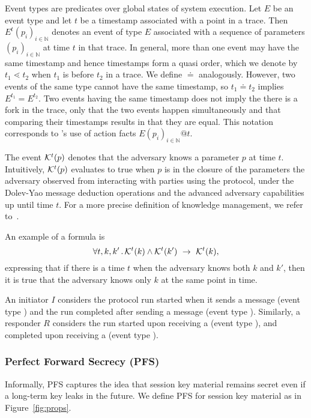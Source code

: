 Event types are predicates over global states of system execution.
%
Let $E$ be an event type and let $t$ be a timestamp associated with a point in a
trace.
%
Then $E^{t}(p_i)_{i\in\mathbb{N}}$ denotes an event of type $E$ associated with
a sequence of parameters $(p_i)_{i\in\mathbb{N}}$ at time $t$ in that trace.
%
In general, more than one event may have the same timestamp and hence
timestamps form a quasi order, which we denote by $t_1 \lessdot t_2$ when $t_1$
is before $t_2$ in a trace.
%
We define $\doteq$ analogously.
%
However, two events of the same type cannot have the same timestamp, so
$t_1 \doteq t_2$ implies $E^{t_1} = E^{t_2}$.
%
Two events having the same timestamp does not imply the there is a fork in the
trace, only that the two events happen simultaneously and that comparing their
timestamps results in that they are equal.
%
This notation corresponds to \mTamarin{}'s use of action facts
$E(p_i)_{i\in\mathbb{N}}@t$.
%

%
%
The event $\mathcal{K}^t(p)$ denotes that the adversary knows a parameter $p$ at
time $t$.
%
Intuitively, $\mathcal{K}^t(p)$ evaluates to true when $p$ is in
the closure of the
parameters the adversary observed from interacting with parties using the
protocol, under the Dolev-Yao message deduction operations and
the advanced adversary capabilities up until time $t$.
%
For a more precise definition of knowledge management, we refer to~\cite{DBLP:conf/cav/MeierSCB13}.
%

An example of a formula is
\[
    \forall t, k, k'\mLogicDot \mK^{t}(k) \land \mK^{t}(k')\ \rightarrow\ 
\mK^{t}(k),
\]
expressing that if there is a time $t$ when the adversary knows both $k$ and
$k'$, then it is true that the adversary knows only $k$ at the same point in
time.

An initiator $I$ considers the
protocol run started when it sends a message \mMsgone{} (event type \mIStart)
and the run completed after sending a message \mMsgthree{} (event type
\mIComplete).
%
Similarly, a responder $R$ considers the run started upon receiving
a \mMsgone{} (event type \mRStart), and completed upon receiving a \mMsgthree{}
(event type \mRComplete).
%
%

\subsubsection{Perfect Forward Secrecy (PFS)}
\label{sec:secrecy}
%
Informally, PFS captures the idea that session key material remains secret
even if a long-term key leaks in the future.
%
We define PFS for session key material \mSessKey{} as \mPredPfs{} in
Figure~\ref{fig:props}.
%

